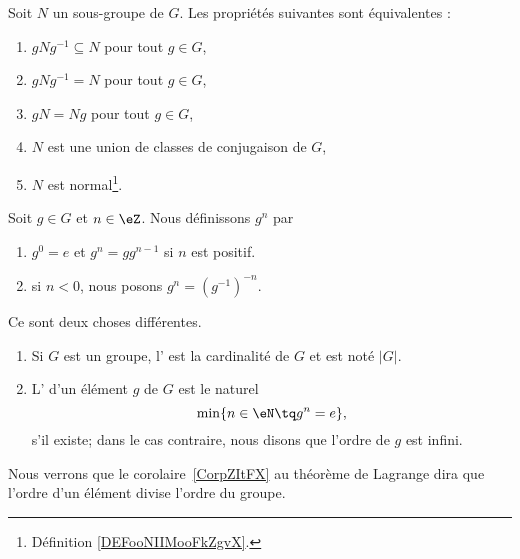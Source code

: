 \begin{proposition}\label{propGroupeNormal}
    Soit \( N\) un sous-groupe de \( G\). Les propriétés suivantes sont équivalentes :
    \begin{enumerate}
        \item
            \( gNg^{-1}\subseteq N\) pour tout \( g\in G\),
        \item
            \( gNg^{-1}= N\) pour tout \( g\in G\),
        \item
            \( gN=Ng\) pour tout \( g\in G\),
        \item
            \( N\) est une union de classes de conjugaison de \( G\),
        \item
            \( N\) est normal\footnote{Définition \ref{DEFooNIIMooFkZgvX}.}.
    \end{enumerate}
\end{proposition}

\begin{definition}
    Soit \( g\in G\) et \( n\in \eZ\). Nous définissons \( g^n\) par
    \begin{enumerate}
        \item
            \( g^0=e\) et \( g^n=gg^{n-1}\) si \( n\) est positif.
        \item
            si \( n<0\), nous posons \( g^n=(g^{-1})^{-n}\).
    \end{enumerate}
\end{definition}

\begin{definition}       \label{DEFooKWBCooMlmpCP}
    Ce sont deux choses différentes.
    \begin{enumerate}
        \item

    Si \( G\) est un groupe, l' est la cardinalité de \( G\) et est noté \( | G |\).
\item

    L' d'un élément \( g\) de \( G\) est le naturel
    \begin{equation}
        \min\{ n\in\eN\tq g^n=e \},
    \end{equation}
    s'il existe; dans le cas contraire, nous disons que l'ordre de \( g\) est infini.
    \end{enumerate}
\end{definition}
Nous verrons que le corolaire~\ref{CorpZItFX} au théorème de Lagrange dira que l'ordre d'un élément divise l'ordre du groupe.

